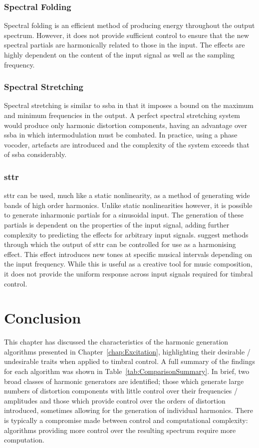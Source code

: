 		\subsubsection*{Spectral Folding}
			Spectral folding is an efficient method of producing energy throughout the output spectrum.
			However, it does not provide sufficient control to ensure that the new spectral partials are
			harmonically related to those in the input. The effects are highly dependent on the content of the
			input signal as well as the sampling frequency.

		\subsubsection*{Spectral Stretching}
			Spectral stretching is similar to \acrshort{ssba} in that it imposes a bound on the maximum and
			minimum frequencies in the output. A perfect spectral stretching system would produce only harmonic
			distortion components, having an advantage over \acrshort{ssba} in which intermodulation must be
			combated. In practice, using a phase vocoder, artefacts are introduced and the complexity of the
			system exceeds that of \acrshort{ssba} considerably.

		\subsubsection*{\acrshort{sttr}}
			\acrshort{sttr} can be used, much like a static nonlinearity, as a method of generating wide bands
			of high order harmonics. Unlike static nonlinearities however, it is possible to generate
			inharmonic partials for a sinusoidal input. The generation of these partials is dependent on the
			properties of the input signal, adding further complexity to predicting the effects for arbitrary
			input signals.  \citet{kim2015harmonizing} suggest methods through which the output of
			\acrshort{sttr} can be controlled for use as a harmonising effect. This effect introduces new tones
			at specific musical intervals depending on the input frequency. While this is useful as a creative
			tool for music composition, it does not provide the uniform response across input signals required
			for timbral control.

\section{Conclusion}
	This chapter has discussed the characteristics of the harmonic generation algorithms presented in
	Chapter~\ref{chap:Excitation}, highlighting their desirable / undesirable traits when applied to timbral control.
	A full summary of the findings for each algorithm was shown in Table~\ref{tab:ComparisonSummary}. In brief, two
	broad classes of harmonic generators are identified; those which generate large numbers of distortion components
	with little control over their frequencies / amplitudes and those which provide control over the orders of
	distortion introduced, sometimes allowing for the generation of individual harmonics. There is typically a
	compromise made between control and computational complexity: algorithms providing more control over the resulting
	spectrum require more computation.

